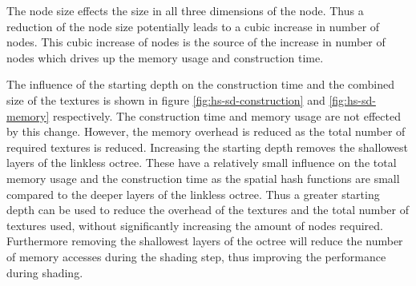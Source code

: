 The node size effects the size in all three dimensions of the node. Thus a reduction of the
node size potentially leads to a cubic increase in number of nodes. This cubic increase
of nodes is the source of the increase in number of nodes which drives up the memory usage
and construction time.

The influence of the starting depth on the construction time and the combined size of the textures
is shown in figure \ref{fig:hs-sd-construction} and \ref{fig:hs-sd-memory} respectively.
The construction time and memory usage
are not effected by this change. However, the memory overhead is reduced as
the total number of required textures is reduced. Increasing the starting depth
removes the shallowest layers of the linkless octree. These have a relatively small
influence on the total memory usage and the construction time as the spatial hash functions
are small compared to the deeper layers of the linkless octree. Thus a greater starting depth
can be used to reduce the overhead of the textures and the total number of textures used,
without significantly increasing the amount of nodes required. Furthermore
removing the shallowest layers of the octree will reduce the number of memory accesses
during the shading step, thus improving the performance during shading.



